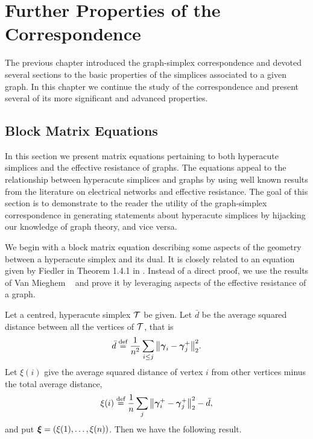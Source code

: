\chapter{Further Properties of the Correspondence}
\label{chap:further_properties}

The previous chapter introduced the graph-simplex correspondence and devoted several sections to the basic properties of the simplices associated to a given graph. In this chapter we  continue the study of the correspondence and present several of its more significant and advanced properties.  



\section{Block Matrix Equations}
\label{sec:block_matrix}
In this section we present matrix equations pertaining to both hyperacute simplices and the effective resistance of graphs. The equations appeal to the relationship between hyperacute simplices and graphs by using well known results from the literature on electrical networks and effective resistance. The goal of this section is to demonstrate to the reader the utility of the graph-simplex correspondence in generating statements about hyperacute simplices by hijacking our knowledge of graph theory,  and vice versa. 

We begin with a block matrix equation describing some aspects of  the geometry between a  hyperacute simplex and its dual. It is closely related to an equation given by Fiedler in Theorem 1.4.1 in \cite{fiedler2011matrices}. Instead  of a direct proof, we use the results of Van Mieghem \etal~\cite{van2017pseudoinverse} and prove it by leveraging aspects of the effective resistance of a graph.  

Let a centred, hyperacute simplex $\mathcal{T}$ be given.  Let $\bar{d}$ be the average squared distance between all the vertices of $\mathcal{T}$, that is
\begin{equation}
\label{eq:avg_squared_distance}
\bar{d} \overset{\text{def}}{=}  \frac{1}{n^2}\sum_{i\leq j} \norm{\vb*{\gamma}_i-\vb*{\gamma}_j^+}_2^2.
\end{equation}
Let $\xi(i)$ give the average squared distance of vertex $i$ from other vertices minus the total average distance, 
\begin{equation}
\label{eq:avg_sqd_distance_i}
\xi(i) \overset{\text{def}}{=} \frac{1}{n}\sum_{j} \norm{\vb*{\gamma}_i^+-\vb*{\gamma}_j^+}_2^2 - \bar{d},
\end{equation}
and put $\vb*{\xi}=(\xi(1),\dots,\xi(n))$. 
Then we have the following result. 

